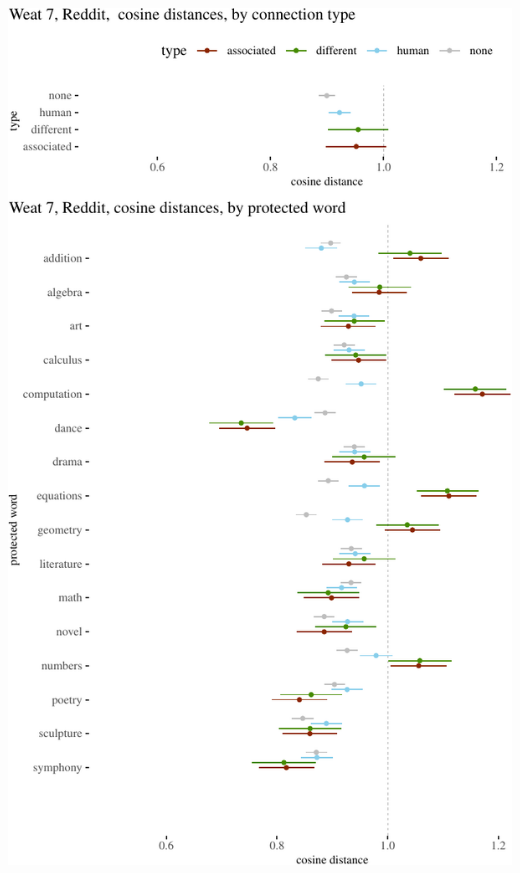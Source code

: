 \documentclass{clv3}
\begin{document}
\begin{center}\includegraphics[width=1\linewidth]{figures/resultsWeat7Reddita} \end{center}
\end{document}
